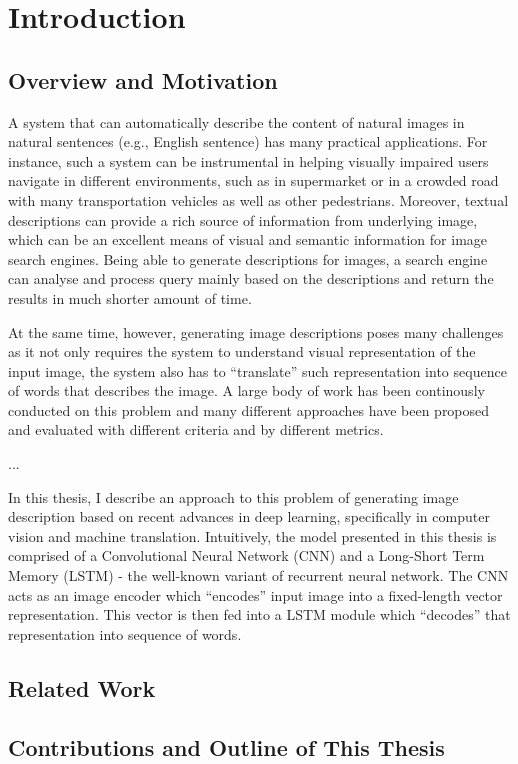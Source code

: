 \chapter{Introduction}

\section{Overview and Motivation}
A system that can automatically describe the content of natural images in natural sentences (e.g., English sentence) has many practical applications. For instance, such a system can be instrumental in helping visually impaired users navigate in different environments, such as in supermarket or in a crowded road with many transportation vehicles as well as other pedestrians. Moreover, textual descriptions can provide a rich source of information from underlying image, which can be an excellent means of visual and semantic information for image search engines. Being able to generate descriptions for images, a search engine can analyse and process query mainly based on the descriptions and return the results in much shorter amount of time.

At the same time, however, generating image descriptions poses many challenges as it not only requires the system to understand visual representation of the input image, the system also has to ``translate'' such representation into sequence of words that describes the image. A large body of work has been continously conducted on this problem and many different approaches have been proposed and evaluated with different criteria and by different metrics.

...

In this thesis, I describe an approach to this problem of generating image description based on recent advances in deep learning, specifically in computer vision and machine translation. Intuitively, the model presented in this thesis is comprised of a Convolutional Neural Network (CNN) and a Long-Short Term Memory (LSTM) - the well-known variant of recurrent neural network. The CNN acts as an image encoder which ``encodes'' input image into a fixed-length vector representation. This vector is then fed into a LSTM module which ``decodes'' that representation into sequence of words.

\section{Related Work}

\section{Contributions and Outline of This Thesis}
